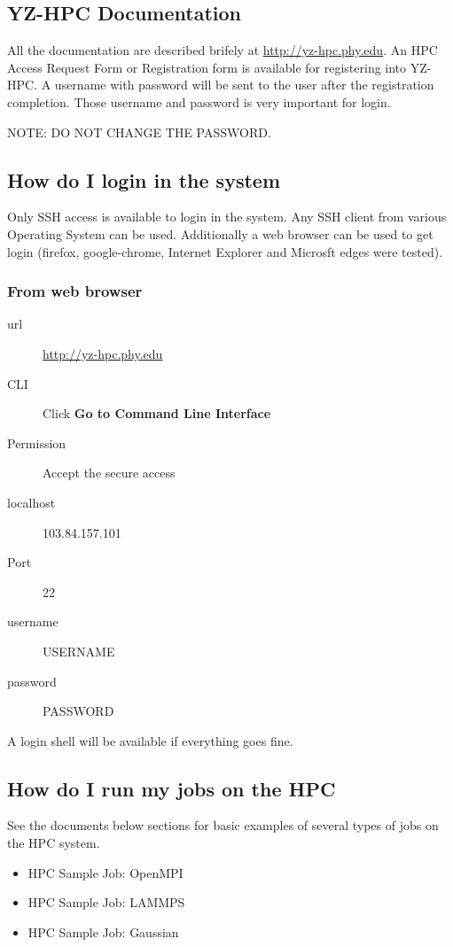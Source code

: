 \documentclass[11pt]{article}
\numberwithin{figure}{section}
\begin{document}
\subsection{YZ-HPC Documentation}
All the documentation are described brifely at \href{http://103.84.157.101} {http://yz-hpc.phy.edu}. An HPC Access Request Form or Registration form is available for registering into YZ-HPC. A username with password will be sent to the user after the registration completion. Those username and password is very important for login.

NOTE: DO NOT CHANGE THE PASSWORD.

\subsection{How do I login in the system}
Only SSH access is available to login in the system. Any SSH client from
various Operating System can be used. Additionally a web browser can be used to
get login (firefox, google-chrome, Internet Explorer and Microsft edges were
tested).

\subsubsection{From web browser}

\begin{description}
    \item[url] \href{http://103.84.157.101}{http://yz-hpc.phy.edu}
    \item[CLI] Click \textbf{Go to Command Line Interface}
    \item[Permission] Accept the secure access
    \item[localhost] 103.84.157.101
    \item[Port] 22
    \item[username] USERNAME
    \item[password] PASSWORD
\end{description}

A login shell will be available if everything goes fine.

\subsection{How do I run my jobs on the HPC}
See the documents below sections for basic examples of several types of jobs on
the HPC system.

\begin{itemize}
    \item HPC Sample Job: OpenMPI
    \item HPC Sample Job: LAMMPS
    \item HPC Sample Job: Gaussian
\end{itemize}
\end{document}
